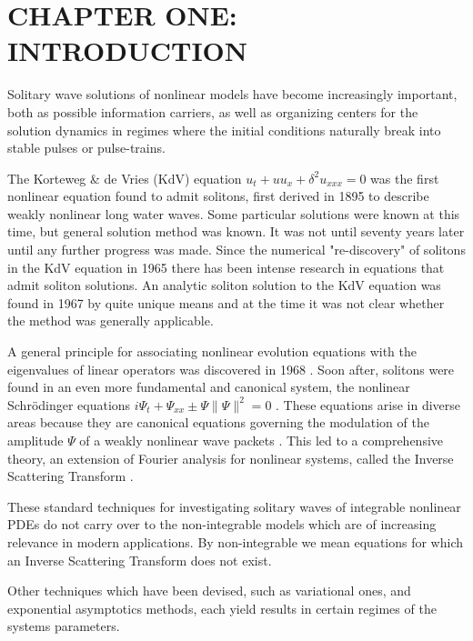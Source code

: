 \chapter{CHAPTER ONE: INTRODUCTION} \label{chapter_1}

Solitary wave solutions of nonlinear models have become increasingly
important, both as possible information carriers,
as well as organizing centers for the solution dynamics in regimes
where the initial conditions naturally break into stable pulses or
pulse-trains.

The Korteweg \& de Vries (KdV) equation $ u_t + u u_x + \delta^2 u_{xxx} = 0$
was the first nonlinear equation found to admit solitons, first derived in 1895
to describe weakly nonlinear long water waves. Some particular solutions were
known at this time, but general solution method was known.  It was not until
seventy years later until any further progress was made.  Since the numerical
"re-discovery" of solitons in the KdV equation \cite{ZK} in 1965 there has been
intense research in equations that admit soliton solutions.  An analytic soliton
solution to the KdV equation was found in 1967 \cite{GGKM} by quite unique means
and at the time it was not clear whether the method was generally applicable.

A general principle for associating nonlinear evolution equations with the
eigenvalues of linear operators was discovered in 1968 \cite{Lax}.  Soon after,
solitons were found in an even more fundamental and canonical system, the
nonlinear Schr\"odinger equations $ i \Psi_t + \Psi_{xx} \pm \Psi\|\Psi\|^2 = 0
$ \cite{ZS}. These equations arise in diverse areas because they are canonical
equations governing the modulation of the amplitude $\Psi$ of a weakly nonlinear
wave packets \cite{DJ}.  This led to a comprehensive theory, an extension of
Fourier analysis for nonlinear systems, called the Inverse Scattering Transform
\cite{AKNS}.

These standard techniques for investigating solitary waves of integrable
nonlinear PDEs do not carry over to the non-integrable models which are of
increasing relevance in modern applications. By non-integrable we mean equations
for which an Inverse Scattering Transform does not exist.

Other techniques which have been devised, such as variational ones, and
exponential asymptotics methods, each yield results in certain regimes of the
systems parameters.

